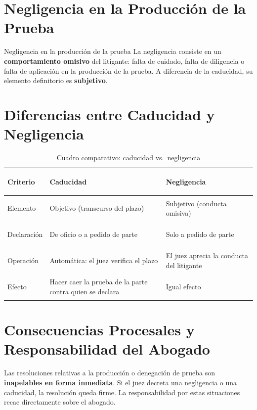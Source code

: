 \documentclass[12pt,oneside]{book}
\begin{document}
\section{Negligencia en la Producción de la Prueba}

\begin{definition}{Negligencia en la producción de la prueba}
La negligencia consiste en un \textbf{comportamiento omisivo} del litigante: falta de cuidado, falta de diligencia o falta de aplicación en la producción de la prueba. A diferencia de la caducidad, su elemento definitorio es \textbf{subjetivo}.
\end{definition}

\section{Diferencias entre Caducidad y Negligencia}

\begin{table}[H]
\centering
\begin{tabularx}{\textwidth}{
    >{\bfseries\raggedright\arraybackslash}p{}
    >{\raggedright\arraybackslash}X
    >{\raggedright\arraybackslash}X
}
\toprule
\textbf{Criterio} & \textbf{Caducidad} & \textbf{Negligencia} \\
\midrule
Elemento        & Objetivo (transcurso del plazo) & Subjetivo (conducta omisiva) \\
\addlinespace
Declaración     & De oficio o a pedido de parte & Solo a pedido de parte \\
\addlinespace
Operación       & Automática: el juez verifica el plazo & El juez aprecia la conducta del litigante \\
\addlinespace
Efecto          & Hacer caer la prueba de la parte contra quien se declara & Igual efecto \\
\bottomrule
\end{tabularx}
\caption{Cuadro comparativo: caducidad vs.\ negligencia}
\end{table}

\section{Consecuencias Procesales y Responsabilidad del Abogado}

\begin{important}
Las resoluciones relativas a la producción o denegación de prueba son \textbf{inapelables en forma inmediata}. Si el juez decreta una negligencia o una caducidad, la resolución queda firme. La responsabilidad por estas situaciones recae directamente sobre el abogado.
\end{important}
\end{document}
